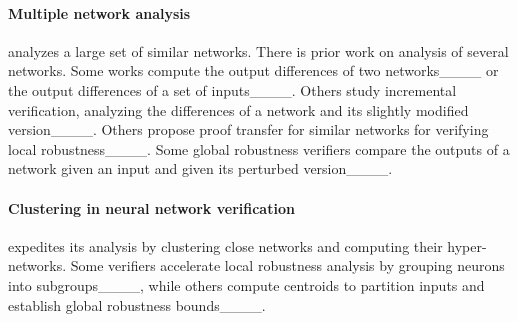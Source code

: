 \paragraph{Multiple network analysis} 
\tool analyzes a large set of similar networks. 
There is prior work on analysis of several networks. 
Some works compute the output differences of two networks____
or the output differences of a set of inputs____. 
Others study incremental verification, analyzing the differences of a network and its slightly modified version____. 
Others propose proof transfer for similar networks for verifying local robustness____. 
Some global robustness verifiers compare the outputs of a network given an input and given its perturbed version____. 
\begin{comment}
\paragraph{Clustering in neural network verification} 
\tool expedites its analysis by clustering close networks and computing their hyper-networks. Several neural network verifiers employ clustering. Some verifiers accelerate local robustness analysis by grouping neurons into subgroups____. A different work divides a dataset's inputs into subgroups, computes a centroid point for each, and computes a global robustness bound for each centroid point____.
\end{comment}


\paragraph{Clustering in neural network verification} 
\tool expedites its analysis by clustering close networks and computing their hyper-networks. %
Some verifiers accelerate local robustness analysis by grouping neurons into subgroups____, while others compute centroids to partition inputs and establish global robustness bounds____.